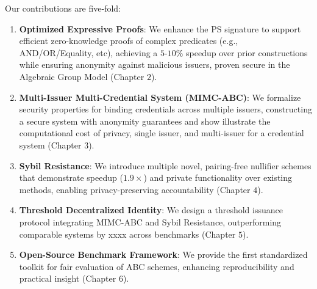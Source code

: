 Our contributions are five-fold:
\begin{enumerate}
    \item \textbf{Optimized Expressive Proofs}: We enhance the PS signature to support efficient zero-knowledge proofs of complex predicates (e.g., AND/OR/Equality, etc), achieving a $5$-$10\%$ speedup over prior constructions while ensuring anonymity against malicious issuers, proven secure in the Algebraic Group Model (Chapter $2$).
    
    \item \textbf{Multi-Issuer Multi-Credential System (MIMC-ABC)}: We formalize security properties for binding credentials across multiple issuers, constructing a secure system with anonymity guarantees and show illustrate the computational cost of privacy, single issuer, and multi-issuer for a credential system
    (Chapter $3$).
    
    \item \textbf{Sybil Resistance}: We introduce multiple novel, pairing-free nullifier schemes that demonstrate speedup ($1.9\times$) and private functionality over existing methods, enabling privacy-preserving accountability (Chapter $4$).
    
    \item \textbf{Threshold Decentralized Identity}: We design a threshold issuance protocol integrating MIMC-ABC and Sybil Resistance, outperforming comparable systems by xxxx across benchmarks (Chapter $5$).
    
    \item \textbf{Open-Source Benchmark Framework}: We provide the first standardized toolkit for fair evaluation of ABC schemes, enhancing reproducibility and practical insight (Chapter $6$).
\end{enumerate}





















